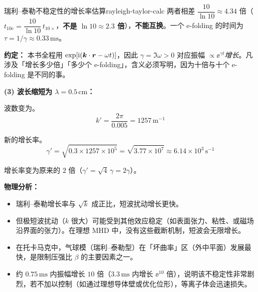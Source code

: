 \begin{example}{瑞利--泰勒不稳定性的增长率估算}{rayleigh-taylor-calc}
两者相差 $\dfrac{10}{\ln10}\approx4.34$ 倍（$t_{10e}=\dfrac{10}{\ln10}\,t_{10\times}$，\textbf{不是 $\ln10\approx2.3$ 倍}），\textbf{不能互换}。一个 e-folding 的时间为 $\tau=1/\gamma\approx0.33\,\mathrm{ms}$。

\textbf{约定：} 本书全程用 $\exp[\mathrm{i}(\bm{k}\cdot\bm{r}-\omega t)]$，因此 $\gamma=\Im\omega>0$ 对应振幅 $\propto\ee^{\gamma t}$\emph{增长}。凡涉及「增长多少倍」「多少个 e-folding」，含义必须写明，因为十倍与十个 e-folding 是不同的事。

\textbf{(3) 波长缩短为 $\lambda = 0.5\,\mathrm{cm}$：}

波数变为。
\[
k' = \frac{2\pi}{0.005} = 1257\,\mathrm{m}^{-1}
\]

新的增长率。
\[
\gamma' = \sqrt{0.3\times 1257\times 10^{5}} = \sqrt{3.77\times 10^{7}}
\approx 6.14\times 10^{3}\,\mathrm{s}^{-1}
\]

增长率变为原来的 $2$ 倍（$\gamma' = \sqrt{4}\,\gamma = 2\gamma$）。

\textbf{物理分析：}
\begin{itemize}[leftmargin=*,itemsep=0pt]
\item 瑞利--泰勒增长率与 $\sqrt{k}$ 成正比，短波扰动增长更快。
\item 但极短波扰动（$k$ 很大）可能受到其他效应稳定（如表面张力、粘性、或磁场沿界面的张力）。在理想 MHD 中，没有这些截断机制，短波会无限增长。
\item 在托卡马克中，气球模（瑞利--泰勒型）在「坏曲率」区（外中平面）发展最快，是限制压强比 $\beta$ 的主要因素之一。
\item 约 $0.75\,\mathrm{ms}$ 内振幅增长 $10$ 倍（$3.3\,\mathrm{ms}$ 内增长 $\ee^{10}$ 倍），说明该不稳定性非常剧烈，若不加以控制（如通过理想导体壁或优化位形），等离子体会迅速损失。
\end{itemize}
\end{example}

